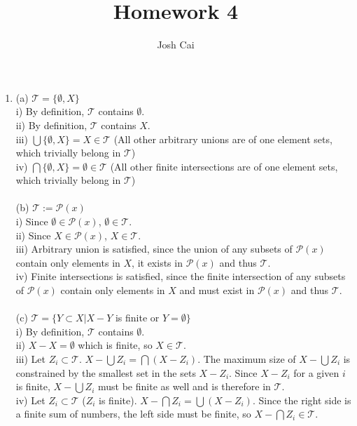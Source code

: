 \documentclass{article}
\begin{document}
\title{Homework 4}
\author{Josh Cai}

\maketitle


\begin{enumerate}
\item
(a) $\mathcal{T} = \{\emptyset, X\}$
\\i) By definition, $\mathcal{T}$ contains $\emptyset$.
\\ii) By definition, $\mathcal{T}$ contains $X$.
\\iii) $\bigcup\{\emptyset,X\} = X \in \mathcal{T}$ (All other arbitrary unions are of one element sets, which trivially belong in $\mathcal{T}$)
\\iv) $\bigcap\{\emptyset,X\} = \emptyset \in \mathcal{T}$ (All other finite intersections are of one element sets, which trivially belong in $\mathcal{T}$)
\\\\(b) $\mathcal{T}:= \mathcal{P}(x)$
\\i) Since $\emptyset\in\mathcal{P}(x)$, $\emptyset \in \mathcal{T}$.
\\ii) Since $X\in\mathcal{P}(x)$, $X \in \mathcal{T}$.
\\iii) Arbitrary union is satisfied, since the union of any subsets of $\mathcal{P}(x)$ contain only elements in $X$, it exists in $\mathcal{P}(x)$ and thus $\mathcal{T}$. 
\\iv) Finite intersections is satisfied, since the finite intersection of any subsets of $\mathcal{P}(x)$ contain only elements in $X$ and must exist in $\mathcal{P}(x)$ and thus $\mathcal{T}$. 
\\\\(c) $\mathcal{T} = \{Y\subset X|X-Y$ is finite or $Y = \emptyset\}$
\\i) By definition, $\mathcal{T}$ contains $\emptyset$.
\\ii) $X-X = \emptyset$ which is finite, so $X \in \mathcal{T}$.
\\iii) Let $Z_i \subset \mathcal{T}$. $X-\bigcup Z_i = \bigcap (X-Z_i)$. The maximum size of $X-\bigcup Z_i$ is constrained by the smallest set in the sets $X-Z_i$. Since $X-Z_i$ for a given $i$ is finite, $X-\bigcup Z_i$ must be finite as well and is therefore in $\mathcal{T}$.
\\iv) Let $Z_i \subset \mathcal{T}$ ($Z_i$ is finite). $X-\bigcap Z_i = \bigcup (X-Z_i)$. Since the right side is a finite sum of numbers, the left side must be finite, so $X-\bigcap Z_i \in \mathcal{T}$.


\end{enumerate}
\end{document}
